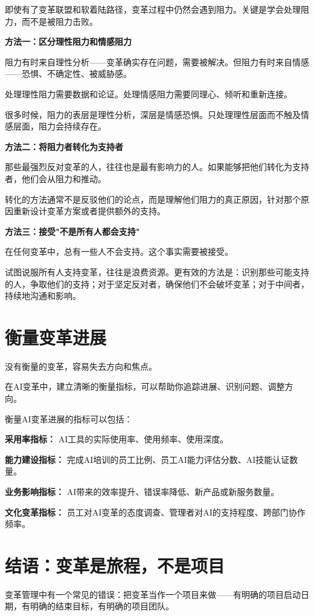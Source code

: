 即使有了变革联盟和软着陆路径，变革过程中仍然会遇到阻力。关键是学会处理阻力，而不是被阻力击败。

\textbf{方法一：区分理性阻力和情感阻力}

阻力有时来自理性分析——变革确实存在问题，需要被解决。但阻力有时来自情感——恐惧、不确定性、被威胁感。

处理理性阻力需要数据和论证。处理情感阻力需要同理心、倾听和重新连接。

很多时候，阻力的表层是理性分析，深层是情感恐惧。只处理理性层面而不触及情感层面，阻力会持续存在。

\textbf{方法二：将阻力者转化为支持者}

那些最强烈反对变革的人，往往也是最有影响力的人。如果能够把他们转化为支持者，他们会从阻力和推动。

转化的方法通常不是反驳他们的论点，而是理解他们阻力的真正原因，针对那个原因重新设计变革方案或者提供额外的支持。

\textbf{方法三：接受"不是所有人都会支持"}

在任何变革中，总有一些人不会支持。这个事实需要被接受。

试图说服所有人支持变革，往往是浪费资源。更有效的方法是：识别那些可能支持的人，争取他们的支持；对于坚定反对者，确保他们不会破坏变革；对于中间者，持续地沟通和影响。

\section{衡量变革进展}


没有衡量的变革，容易失去方向和焦点。

在AI变革中，建立清晰的衡量指标，可以帮助你追踪进展、识别问题、调整方向。

衡量AI变革进展的指标可以包括：

\textbf{采用率指标：} AI工具的实际使用率、使用频率、使用深度。

\textbf{能力建设指标：} 完成AI培训的员工比例、员工AI能力评估分数、AI技能认证数量。

\textbf{业务影响指标：} AI带来的效率提升、错误率降低、新产品或新服务数量。

\textbf{文化变革指标：} 员工对AI变革的态度调查、管理者对AI的支持程度、跨部门协作频率。

\section{结语：变革是旅程，不是项目}


变革管理中有一个常见的错误：把变革当作一个项目来做——有明确的项目启动日期，有明确的结束目标，有明确的项目团队。

